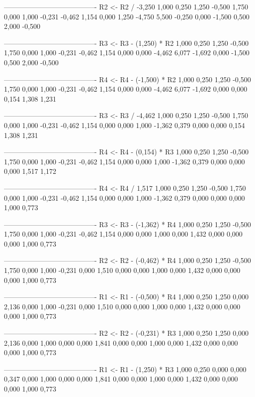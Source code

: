 \documentclass[12pt]{article}
\begin{document}
\begin{enumerate}
\begin{keluaran}
----------------------------------------
R2 <- R2 / -3,250
1,000   0,250   1,250   -0,500  1,750
0,000   1,000   -0,231  -0,462  1,154
0,000   1,250   -4,750  5,500   -0,250
0,000   -1,500  0,500   2,000   -0,500

----------------------------------------
R3 <- R3 - (1,250) * R2
1,000   0,250   1,250   -0,500  1,750
0,000   1,000   -0,231  -0,462  1,154
0,000   0,000   -4,462  6,077   -1,692
0,000   -1,500  0,500   2,000   -0,500

----------------------------------------
R4 <- R4 - (-1,500) * R2
1,000   0,250   1,250   -0,500  1,750
0,000   1,000   -0,231  -0,462  1,154
0,000   0,000   -4,462  6,077   -1,692
0,000   0,000   0,154   1,308   1,231

----------------------------------------
R3 <- R3 / -4,462
1,000   0,250   1,250   -0,500  1,750
0,000   1,000   -0,231  -0,462  1,154
0,000   0,000   1,000   -1,362  0,379
0,000   0,000   0,154   1,308   1,231

----------------------------------------
R4 <- R4 - (0,154) * R3
1,000   0,250   1,250   -0,500  1,750
0,000   1,000   -0,231  -0,462  1,154
0,000   0,000   1,000   -1,362  0,379
0,000   0,000   0,000   1,517   1,172

----------------------------------------
R4 <- R4 / 1,517
1,000   0,250   1,250   -0,500  1,750
0,000   1,000   -0,231  -0,462  1,154
0,000   0,000   1,000   -1,362  0,379
0,000   0,000   0,000   1,000   0,773

----------------------------------------
R3 <- R3 - (-1,362) * R4
1,000   0,250   1,250   -0,500  1,750
0,000   1,000   -0,231  -0,462  1,154
0,000   0,000   1,000   0,000   1,432
0,000   0,000   0,000   1,000   0,773

----------------------------------------
R2 <- R2 - (-0,462) * R4
1,000   0,250   1,250   -0,500  1,750
0,000   1,000   -0,231  0,000   1,510
0,000   0,000   1,000   0,000   1,432
0,000   0,000   0,000   1,000   0,773

----------------------------------------
R1 <- R1 - (-0,500) * R4
1,000   0,250   1,250   0,000   2,136
0,000   1,000   -0,231  0,000   1,510
0,000   0,000   1,000   0,000   1,432
0,000   0,000   0,000   1,000   0,773

----------------------------------------
R2 <- R2 - (-0,231) * R3
1,000   0,250   1,250   0,000   2,136
0,000   1,000   0,000   0,000   1,841
0,000   0,000   1,000   0,000   1,432
0,000   0,000   0,000   1,000   0,773

----------------------------------------
R1 <- R1 - (1,250) * R3
1,000   0,250   0,000   0,000   0,347
0,000   1,000   0,000   0,000   1,841
0,000   0,000   1,000   0,000   1,432
0,000   0,000   0,000   1,000   0,773


\end{keluaran}
\end{enumerate}
\end{document}
